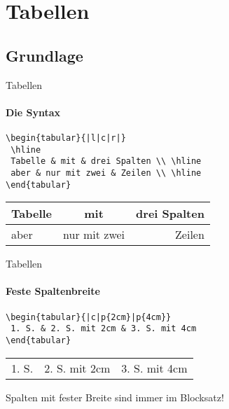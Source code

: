 \section{Tabellen}

\subsection{Grundlage}
\begin{frame}[fragile]{Tabellen}
\framesubtitle{Die Syntax}
\begin{codeblock}
\begin{verbatim}
\begin{tabular}{|l|c|r|}
 \hline
 Tabelle & mit & drei Spalten \\ \hline
 aber & nur mit zwei & Zeilen \\ \hline
\end{tabular}
\end{verbatim}
\end{codeblock}
\pause

\medskip
  \begin{table}
  \center
    \begin{tabular}{|l|c|r|}\hline
      Tabelle & mit & drei Spalten \\\hline
      aber & nur mit zwei & Zeilen \\\hline
    \end{tabular}
    \end{table}
\end{frame}

\begin{frame}[fragile]{Tabellen}
\framesubtitle{Feste Spaltenbreite}
\begin{codeblock}
\begin{verbatim}
\begin{tabular}{|c|p{2cm}|p{4cm}}
 1. S. & 2. S. mit 2cm & 3. S. mit 4cm
\end{tabular}
\end{verbatim}
\end{codeblock}
\pause

\medskip
    \begin{table}
    \center
    \begin{tabular}{|c|p{2cm}|p{4cm}}
      1. S. & 2. S. mit 2cm & 3. S. mit 4cm
    \end{tabular}
    \end{table}\pause
    \medskip
    
Spalten mit fester Breite sind immer im Blocksatz!
\end{frame}

